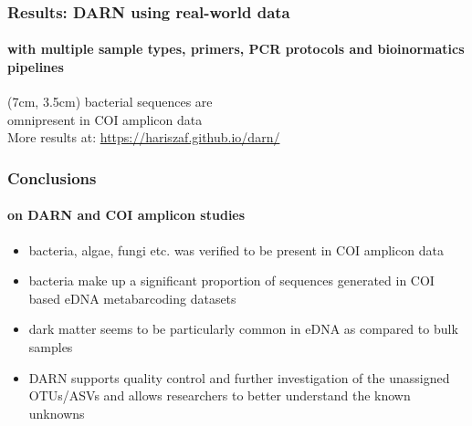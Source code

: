 \documentclass{beamer}
\begin{document}
   \begin{frame}
      \frametitle{Results: DARN using real-world data}
      \framesubtitle{with multiple sample types, primers, PCR protocols and bioinormatics pipelines}


      \begin{textblock*}{6cm}(7cm, 3.5cm)
         bacterial sequences are \\ 
         omnipresent in COI amplicon data \\
         \bigskip
         More results at:
         \href{https://hariszaf.github.io/darn/}{https://hariszaf.github.io/darn/} \\
      \end{textblock*}

   \end{frame}

   \begin{frame}
      \frametitle{Conclusions}
      \framesubtitle{on DARN and COI amplicon studies}
      \begin{itemize}
         \item \small bacteria, algae, fungi etc. was verified to be present in COI amplicon data
         \item \small bacteria make up a significant proportion of sequences generated in COI based eDNA metabarcoding datasets
         \item \small dark matter seems to be particularly common in eDNA as compared to bulk samples
         \item \small DARN supports quality control and further investigation of the unassigned OTUs/ASVs and
               \small allows researchers to better understand the known unknowns
      \end{itemize}
   \end{frame}
\end{document}
